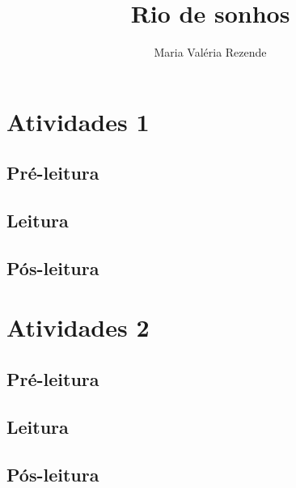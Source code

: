 \documentclass{article}
\begin{document}
\newcommand{\AutorLivro}{Maria Valéria Rezende}
\newcommand{\TituloLivro}{Rio de sonhos}
\newcommand{\Tema}{Ficção, mistério e fantasia}
\newcommand{\Genero}{Romance}
\newcommand{\issnppub}{---}
\newcommand{\issnepub}{---}
\newcommand{\colaborador}{\textbf{Fulano de Tal} é uma pessoa incrível e vai fazer um bom serviço.}


\title{\TituloLivro}
\author{\AutorLivro}
\def\authornotes{\colaborador}

\date{}
\maketitle
\tableofcontents




\section{Atividades 1}


\subsection{Pré-leitura}
\subsection{Leitura}
\subsection{Pós-leitura}



\section{Atividades 2}

\subsection{Pré-leitura}
\subsection{Leitura}
\subsection{Pós-leitura}

\lipsum
\end{document}
